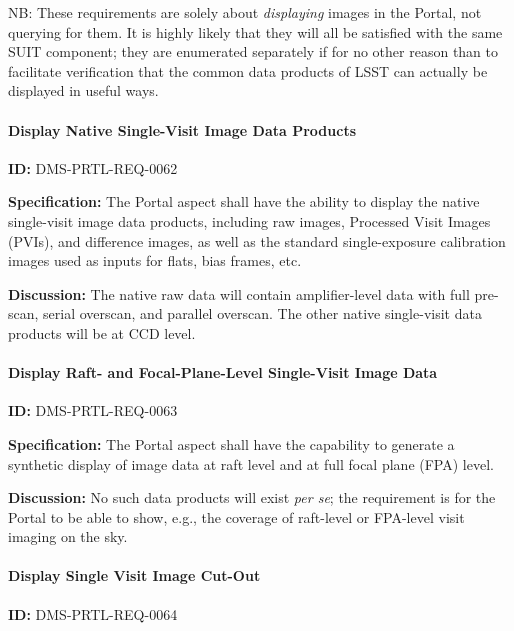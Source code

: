 \documentclass[SE,toc,lsstdraft]{lsstdoc}
\begin{document}
NB: These requirements are solely about \textit{displaying} images in the Portal, not querying for them. It is highly likely that they will all be satisfied with the same SUIT component; they are enumerated separately if for no other reason than to facilitate verification that the common data products of LSST can actually be displayed in useful ways.

\paragraph{Display Native Single-Visit Image Data Products}\hfill  %

\label{DMS-PRTL-REQ-0062}
\textbf{ID:} DMS-PRTL-REQ-0062

\textbf{Specification:}
The Portal aspect shall have the ability to display the native single-visit image data products, including raw images, Processed Visit Images (PVIs), and difference images, as well as the standard single-exposure calibration images used as inputs for flats, bias frames, etc.

\textbf{Discussion:}
The native raw data will contain amplifier-level data with full pre-scan, serial overscan, and parallel overscan.
The other native single-visit data products will be at CCD level.

\paragraph{Display Raft- and Focal-Plane-Level Single-Visit  Image Data}\hfill  %

\label{DMS-PRTL-REQ-0063}
\textbf{ID:} DMS-PRTL-REQ-0063

\textbf{Specification:}
The Portal aspect shall have the capability to generate a synthetic display of image data at raft level and at full focal plane (FPA) level.

\textbf{Discussion:}
No such data products will exist \textit{per se}; the requirement is for the Portal to be able to show, e.g., the coverage of raft-level or FPA-level visit imaging on the sky.

\paragraph{Display Single Visit Image Cut-Out}\hfill  %

\label{DMS-PRTL-REQ-0064}
\textbf{ID:} DMS-PRTL-REQ-0064
\end{document}
